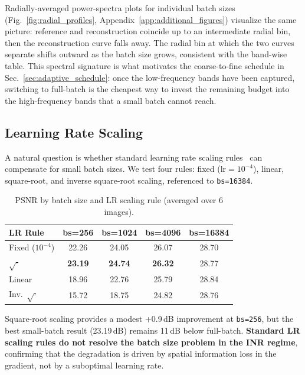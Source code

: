 \documentclass[a4paper,oneside,11pt,english]{scrartcl}
\begin{document}
Radially-averaged power-spectra plots for individual batch sizes
(Fig.~\ref{fig:radial_profiles}, Appendix~\ref{app:additional_figures})
visualize the same picture: reference and reconstruction coincide up to an
intermediate radial bin, then the reconstruction curve falls away.  The
radial bin at which the two curves separate shifts outward as the batch size
grows, consistent with the band-wise table.  This spectral signature is what
motivates the coarse-to-fine schedule in
Sec.~\ref{sec:adaptive_schedule}: once the low-frequency bands have been
captured, switching to full-batch is the cheapest way to invest the remaining
budget into the high-frequency bands that a small batch cannot reach.

\subsection{Learning Rate Scaling}

A natural question is whether standard learning rate scaling
rules~\cite{smith2018dont, goyal2017accurate} can compensate for small batch
sizes.  We test four rules: fixed ($\text{lr} = 10^{-4}$), linear, square-root,
and inverse square-root scaling, referenced to \texttt{bs=16384}.

\begin{table}[H]
\centering
\caption{PSNR by batch size and LR scaling rule (averaged over 6 images).}
\label{tab:lr_scaling}
\begin{tabular}{lcccc}
\toprule
LR Rule & bs=256 & bs=1024 & bs=4096 & bs=16384 \\
\midrule
Fixed ($10^{-4}$)  & 22.26 & 24.05 & 26.07 & 28.70 \\
$\sqrt{\cdot}$     & \textbf{23.19} & \textbf{24.74} & \textbf{26.32} & 28.77 \\
Linear             & 18.96 & 22.76 & 25.79 & 28.84 \\
Inv.\ $\sqrt{\cdot}$ & 15.72 & 18.75 & 24.82 & 28.76 \\
\bottomrule
\end{tabular}
\end{table}

Square-root scaling provides a modest +0.9\,dB improvement at \texttt{bs=256},
but the best small-batch result (23.19\,dB) remains 11\,dB below full-batch.
\textbf{Standard LR scaling rules do not resolve the batch size problem in
the INR regime}, confirming that the degradation is driven by spatial
information loss in the gradient, not by a suboptimal learning rate.
\end{document}
